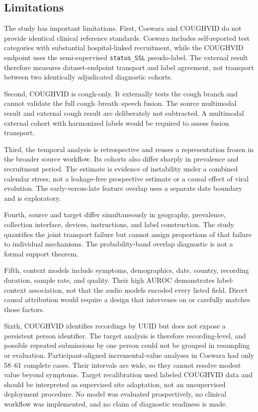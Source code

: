 \documentclass[journal]{IEEEtran}
\begin{document}
\subsection{Limitations}

The study has important limitations. First, Coswara and COUGHVID do not provide identical clinical reference standards. Coswara includes self-reported test categories with substantial hospital-linked recruitment, while the COUGHVID endpoint uses the semi-supervised \texttt{status\_SSL} pseudo-label. The external result therefore measures dataset-endpoint transport and label agreement, not transport between two identically adjudicated diagnostic cohorts.

Second, COUGHVID is cough-only. It externally tests the cough branch and cannot validate the full cough--breath--speech fusion. The source multimodal result and external cough result are deliberately not subtracted. A multimodal external cohort with harmonized labels would be required to assess fusion transport.

Third, the temporal analysis is retrospective and reuses a representation frozen in the broader source workflow. Its cohorts also differ sharply in prevalence and recruitment period. The estimate is evidence of instability under a combined calendar stress, not a leakage-free prospective estimate or a causal effect of viral evolution. The early-versus-late feature overlap uses a separate date boundary and is exploratory.

Fourth, source and target differ simultaneously in geography, prevalence, collection interface, devices, instructions, and label construction. The study quantifies the joint transport failure but cannot assign proportions of that failure to individual mechanisms. The probability-band overlap diagnostic is not a formal support theorem.

Fifth, context models include symptoms, demographics, date, country, recording duration, sample rate, and quality. Their high AUROC demonstrates label-context association, not that the audio models encoded every listed field. Direct causal attribution would require a design that intervenes on or carefully matches those factors.

Sixth, COUGHVID identifies recordings by UUID but does not expose a persistent person identifier. The target analysis is therefore recording-level, and possible repeated submissions by one person could not be grouped in resampling or evaluation. Participant-aligned incremental-value analyses in Coswara had only 58--61 complete cases. Their intervals are wide, so they cannot resolve modest value beyond symptoms. Target recalibration used labeled COUGHVID data and should be interpreted as supervised site adaptation, not an unsupervised deployment procedure. No model was evaluated prospectively, no clinical workflow was implemented, and no claim of diagnostic readiness is made.
\end{document}
